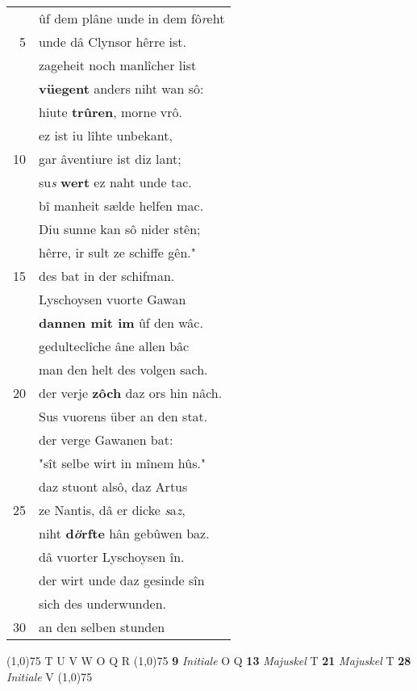 \documentclass[8pt,a4paper,notitlepage]{article}
\begin{document}
\begin{table}[ht]
\begin{minipage}[t]{0.5\linewidth}
\begin{tabular}{rl}
 & ûf dem plâne unde in dem fô\textit{r}eht\\ 
5 & unde dâ Clynsor hêrre ist.\\ 
 & zageheit noch manlîcher list\\ 
 & \textbf{vüegent} anders niht wan sô:\\ 
 & hiute \textbf{trûren}, morne vrô.\\ 
 & ez ist iu lîhte unbekant,\\ 
10 & gar âventiure ist diz lant;\\ 
 & su\textit{s} \textbf{wert} ez naht unde tac.\\ 
 & bî manheit sælde helfen mac.\\ 
 & Diu sunne kan sô nider stên;\\ 
 & hêrre, ir sult ze schiffe gên."\\ 
15 & des bat in der schifman.\\ 
 & Lyschoysen vuorte Gawan\\ 
 & \textbf{dannen mit im} ûf den wâc.\\ 
 & gedulteclîche âne allen bâc\\ 
 & man den helt des volgen sach.\\ 
20 & der verje \textbf{zôch} daz ors hin nâch.\\ 
 & Sus vuorens über an den stat.\\ 
 & der verge Gawanen bat:\\ 
 & "sît selbe wirt in mînem hûs."\\ 
 & daz stuont alsô, daz Artus\\ 
25 & ze Nantis, dâ er dicke \textit{s}a\textit{z},\\ 
 & niht \textbf{d\textit{ö}rfte} hân gebûwen baz.\\ 
 & dâ vuorter Lyschoysen în.\\ 
 & der wirt unde daz gesinde sîn\\ 
 & sich des underwunden.\\ 
30 & an den selben stunden\\ 
\end{tabular}
\scriptsize
\line(1,0){75} \newline
T U V W O Q R \newline
\line(1,0){75} \newline
\textbf{9} \textit{Initiale} O Q  \textbf{13} \textit{Majuskel} T  \textbf{21} \textit{Majuskel} T  \textbf{28} \textit{Initiale} V  \newline
\line(1,0){75} \newline

\end{minipage}
\end{table}
\end{document}
